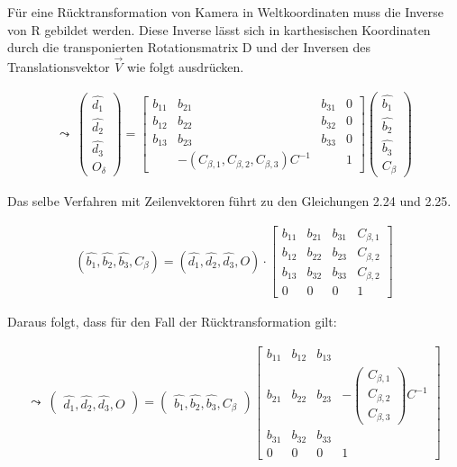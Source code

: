 Für eine Rücktransformation von Kamera in Weltkoordinaten muss die Inverse von R gebildet werden. Diese Inverse lässt sich in karthesischen Koordinaten durch die transponierten Rotationsmatrix D und der Inversen des Translationsvektor $\vec{V}$ wie folgt ausdrücken.

\begin{gather}
	\leadsto \: \begin{pmatrix}
		\hat{d_1}\\
		\hat{d_2}\\
		\hat{d_3}\\
		O_\delta
	\end{pmatrix} = 
	\begin{bmatrix}
		b_{11} & b_{21} & b_{31} & 0\\
		b_{12} & b_{22} & b_{32} & 0\\
		b_{13} & b_{23} & b_{33} & 0\\
		&-(	C_{\beta,1}, C_{\beta,2}, C_{\beta,3})C^{-1}& & 1
	\end{bmatrix}
	\begin{pmatrix}
		\hat{b_1}\\
		\hat{b_2}\\
		\hat{b_3}\\
		C_\beta
	\end{pmatrix}
\end{gather}

Das selbe Verfahren mit Zeilenvektoren führt zu den Gleichungen 2.24 und 2.25.

\begin{gather}
	(\hat{b_1}, \hat{b_2}, \hat{b_3}, C_\beta) = (\hat{d_1},\hat{d_2}, \hat{d_3}, O) \cdot
	\begin{bmatrix} 
		b_{11} & b_{21} & b_{31} & C_{\beta,1}\\
		b_{12} & b_{22} & b_{23} & C_{\beta,2}\\
		b_{13} & b_{32} & b_{33} & C_{\beta,2}\\
		0           &       0       &   0         & 1   
	\end{bmatrix}
\end{gather}	

Daraus folgt, dass für den Fall der Rücktransformation gilt:

\begin{gather}
	\leadsto \: \begin{pmatrix}
		\hat{d_1},\hat{d_2},\hat{d_3},O
	\end{pmatrix} = 
		\begin{pmatrix}
	\hat{b_1},\hat{b_2},\hat{b_3},C_\beta
	\end{pmatrix}
	\begin{bmatrix}
		b_{11} & b_{12} & b_{13} & \\
		b_{21} & b_{22} & b_{23} &  -\begin{pmatrix}
			C_{\beta,1}\\
			C_{\beta,2}\\
			C_{\beta,3}
		\end{pmatrix}C^{-1}\\
		b_{31} & b_{32} & b_{33} & \\
		0&0&0 & 1
	\end{bmatrix}
\end{gather}	


